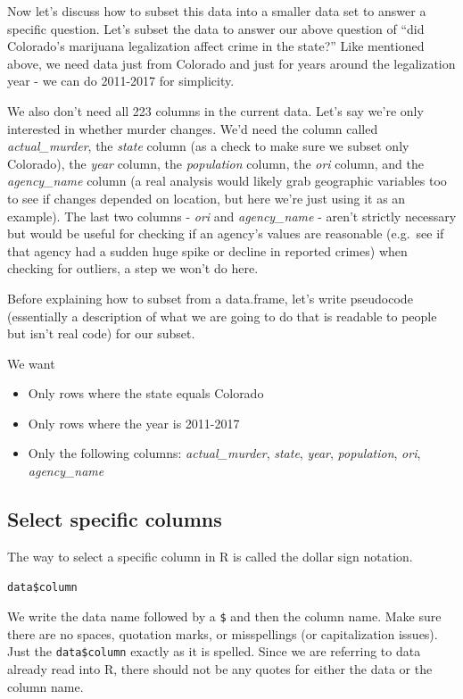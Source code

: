 \documentclass[
  a4paper,
]{krantz}
\providecommand{\tightlist}{%
  \setlength{\itemsep}{0pt}\setlength{\parskip}{0pt}}
\begin{document}
Now let's discuss how to subset this data into a smaller
data set to answer a specific question. Let's subset the
data to answer our above question of ``did Colorado's
marijuana legalization affect crime in the state?'' Like
mentioned above, we need data just from Colorado and just
for years around the legalization year - we can do 2011-2017
for simplicity.

We also don't need all 223 columns in the current data.
Let's say we're only interested in whether murder changes.
We'd need the column called \emph{actual\_murder}, the
\emph{state} column (as a check to make sure we subset only
Colorado), the \emph{year} column, the \emph{population}
column, the \emph{ori} column, and the \emph{agency\_name}
column (a real analysis would likely grab geographic
variables too to see if changes depended on location, but
here we're just using it as an example). The last two
columns - \emph{ori} and \emph{agency\_name} - aren't
strictly necessary but would be useful for checking if an
agency's values are reasonable (e.g.~see if that agency had
a sudden huge spike or decline in reported crimes) when
checking for outliers, a step we won't do here.

Before explaining how to subset from a data.frame, let's
write pseudocode (essentially a description of what we are
going to do that is readable to people but isn't real code)
for our subset.

We want

\begin{itemize}
\tightlist
\item
  Only rows where the state equals Colorado
\item
  Only rows where the year is 2011-2017
\item
  Only the following columns: \emph{actual\_murder},
  \emph{state}, \emph{year}, \emph{population}, \emph{ori},
  \emph{agency\_name}
\end{itemize}

\hypertarget{select-specific-columns}{%
\subsection{Select specific
columns}\label{select-specific-columns}}

The way to select a specific column in R is called the
dollar sign notation.

\texttt{data\$column}

We write the data name followed by a \texttt{\$} and then
the column name. Make sure there are no spaces, quotation
marks, or misspellings (or capitalization issues). Just the
\texttt{data\$column} exactly as it is spelled. Since we are
referring to data already read into R, there should not be
any quotes for either the data or the column name.
\end{document}
